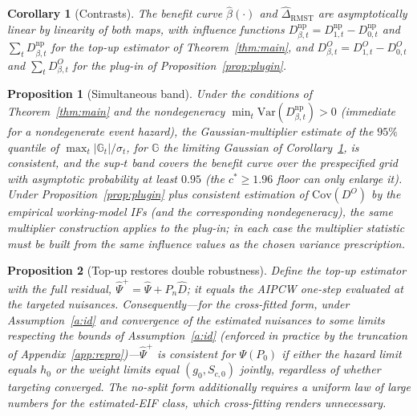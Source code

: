 \documentclass[11pt]{article}
\newtheorem{proposition}{Proposition}
\newtheorem{corollary}{Corollary}
\theoremstyle{remark}
\newcommand{\Pn}{P_n}
\begin{document}
\begin{corollary}[Contrasts]\label{cor:contrasts}
The benefit curve $\hat\beta(\cdot)$ and $\widehat\Delta_{\mathrm{RMST}}$ are asymptotically linear by linearity of both maps, with influence functions $D^{\mathrm{np}}_{\beta,t} = D^{\mathrm{np}}_{1,t}-D^{\mathrm{np}}_{0,t}$ and $\sum_t D^{\mathrm{np}}_{\beta,t}$ for the top-up estimator of Theorem~\ref{thm:main}, and $D^{O}_{\beta,t} = D^{O}_{1,t}-D^{O}_{0,t}$ and $\sum_t D^{O}_{\beta,t}$ for the plug-in of Proposition~\ref{prop:plugin}.
\end{corollary}

\begin{proposition}[Simultaneous band]\label{prop:band}
Under the conditions of Theorem~\ref{thm:main} and the nondegeneracy $\min_t \mathrm{Var}(D^{\mathrm{np}}_{\beta,t}) > 0$ (immediate for a nondegenerate event hazard), the Gaussian-multiplier estimate of the $95\%$ quantile of $\max_t |\mathbb{G}_t|/\sigma_t$, for $\mathbb{G}$ the limiting Gaussian of Corollary~\ref{cor:contrasts}, is consistent, and the sup-$t$ band covers the benefit curve over the prespecified grid with asymptotic probability at least $0.95$ (the $c^\ast\ge1.96$ floor can only enlarge it). Under Proposition~\ref{prop:plugin} plus consistent estimation of $\mathrm{Cov}(D^{O})$ by the empirical working-model IFs (and the corresponding nondegeneracy), the same multiplier construction applies to the plug-in; in each case the multiplier statistic must be built from the same influence values as the chosen variance prescription.
\end{proposition}

\begin{proposition}[Top-up restores double robustness]\label{prop:dr}
Define the top-up estimator with the \emph{full} residual, $\widehat\Psi^{+} = \widehat\Psi + \Pn \widehat D$; it equals the AIPCW one-step evaluated at the targeted nuisances. Consequently---for the cross-fitted form, under Assumption~\ref{a:id} and convergence of the estimated nuisances to \emph{some} limits respecting the bounds of Assumption~\ref{a:id} (enforced in practice by the truncation of Appendix~\ref{app:repro})---$\widehat\Psi^{+}$ is consistent for $\Psi(P_0)$ if either the hazard limit equals $h_0$ or the weight limits equal $(g_0, S_{c,0})$ jointly, regardless of whether targeting converged. The no-split form additionally requires a uniform law of large numbers for the estimated-EIF class, which cross-fitting renders unnecessary.
\end{proposition}
\end{document}
